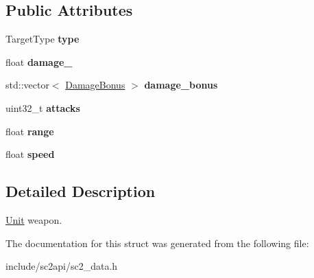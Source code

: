 \subsection*{Public Attributes}
\begin{DoxyCompactItemize}
\item 
\mbox{\label{structsc2_1_1_weapon_a01a16b93a7ebf597ab92819f1983058f}} 
Target\+Type {\bfseries type}
\item 
\mbox{\label{structsc2_1_1_weapon_ae0eb020a8b5df534b5921445a5148a7e}} 
float {\bfseries damage\+\_\+}
\item 
\mbox{\label{structsc2_1_1_weapon_a2c6805c104afc8e5f7351fadfed662c7}} 
std\+::vector$<$ \hyperlink{structsc2_1_1_damage_bonus}{Damage\+Bonus} $>$ {\bfseries damage\+\_\+bonus}
\item 
\mbox{\label{structsc2_1_1_weapon_a94f96140ceda50d81831f25880ecb53d}} 
uint32\+\_\+t {\bfseries attacks}
\item 
\mbox{\label{structsc2_1_1_weapon_a2e1f8b010cb5f427893e0441ba04e557}} 
float {\bfseries range}
\item 
\mbox{\label{structsc2_1_1_weapon_a36a66499bcad3c59386f861fb439bab0}} 
float {\bfseries speed}
\end{DoxyCompactItemize}


\subsection{Detailed Description}
\hyperlink{classsc2_1_1_unit}{Unit} weapon. 

The documentation for this struct was generated from the following file\+:\begin{DoxyCompactItemize}
\item 
include/sc2api/sc2\+\_\+data.\+h\end{DoxyCompactItemize}
